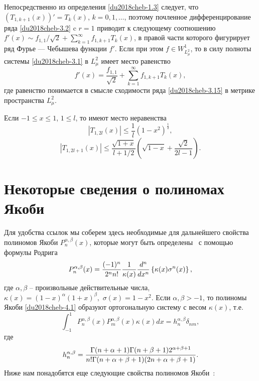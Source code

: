 Непосредственно из определения \eqref{du2018cheb-1.3} следует, что $(T_{1,k+1}(x))'=T_k(x)$, $k=0,1,\ldots$,
поэтому почленное дифференцирование ряда \eqref{du2018cheb-3.2} c $r=1$ приводит к следующему соотношению
$f'(x)\sim f_{1,1}/\sqrt{2} + \sum_{k=1}^\infty f_{1,k+1}T_k(x)$, в правой части которого фигурирует ряд Фурье --- Чебышева функции $f'$. Если при этом $f\in W^1_{L^2_\mu}$, то в силу полноты системы
\eqref{du2018cheb-3.1} в $L^2_\mu$ имеет место равенство
\begin{equation}\label{du2018cheb-3.15}
f'(x)= \frac{f_{1,1}}{\sqrt{2}} + \sum_{k=1}^\infty f_{1,k+1}T_k(x),
\end{equation}
где равенство понимается в смысле сходимости ряда \eqref{du2018cheb-3.15} в метрике пространства $L^2_\mu$.
\begin{theorem}\label{du2018cheb-th2}
	Если  $-1\le x\le1$, $1\le l$, то имеют место неравенства
	\begin{equation}\label{du2018cheb-3.16}
	|T_{1,2l}(x)|\le \frac{1}{l}(1-x^2)^\frac12,
	\end{equation}
	\begin{equation}\label{du2018cheb-3.17}
	|T_{1,2l+1}(x)|\le\frac{\sqrt{1+x}}{l+1/2}\left(\sqrt{1-x}+\frac{\sqrt{2}}{2l-1}\right).
	\end{equation}
\end{theorem}

\section{ Некоторые сведения о полиномах Якоби}

Для удобства ссылок мы соберем здесь необходимые для дальнейшего
свойства полиномов Якоби $P_n^{\alpha,\beta}(x)$, которые могут быть
определены~\cite{Sege}  с помощью формулы Родрига
\begin{equation}\label{du2018cheb-4.1}
P_n^{\alpha,\beta}(x) = {(-1)^n\over2^nn!}{1\over\kappa(x)}{d^n\over
	dx^n} \left\{\kappa(x)\sigma^n(x)\right\},
\end{equation}
где $\alpha,\beta$ -- произвольные действительные числа, $\kappa(x)=
(1-x)^\alpha(1+x)^\beta,\,\,\sigma(x)=1-x^2$. Если
$\alpha,\beta>-1$, то полиномы Якоби \eqref{du2018cheb-4.1} образуют ортогональную
систему с весом $\kappa(x)$, т.е.
\begin{equation}\label{du2018cheb-4.2}
\int_{-1}^1P_n^{\alpha,\beta}(x)P_m^{\alpha,\beta}(x)\kappa(x)dx =
h_n^{\alpha,\beta}\delta_{nm},
\end{equation}
где
\begin{equation}\label{du2018cheb-4.3}
h_n^{\alpha,\beta} =
{\Gamma(n+\alpha+1)\Gamma(n+\beta+1)2^{\alpha+\beta+1} \over
	n!\Gamma(n+\alpha+\beta+1)(2n+\alpha+\beta+1)}.
\end{equation}
Ниже нам понадобятся еще следующие свойства полиномов
Якоби~\cite{Sege}:


